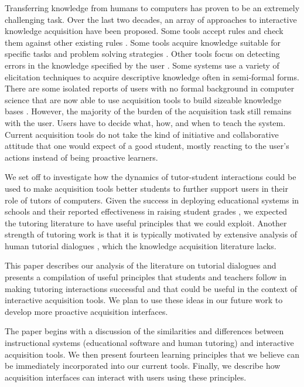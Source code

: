 \documentclass{llncs}
\begin{document}
Transferring knowledge from humans to computers has proven to be an extremely
challenging task.  Over the last two decades, an array of approaches to
interactive knowledge acquisition have been proposed.  Some tools accept rules
and check them against other existing rules \cite{Davis79,seek2}.  Some tools
acquire knowledge suitable for specific tasks and problem solving strategies
\cite{MarcusM89}.  Other tools focus on detecting errors in the knowledge
specified by the user \cite{GilM96,KimG99,chimaera00}.  Some systems use a
variety of elicitation techniques to acquire descriptive knowledge
\cite{GainesS93,cmaps1} often in semi-formal forms.  There are some isolated
reports of users with no formal background in computer science that are now
able to use acquisition tools to build sizeable knowledge bases
\cite{KimG00,EriksEA95,Clark01}.
However, the majority of the burden of the acquisition task still remains with
the user.  Users have to decide what, how, and when to teach the system.  
Current acquisition tools do not take the kind of
initiative and collaborative attitude that one would expect of a good student,
mostly reacting to the user's actions instead of being proactive learners.

We set off to investigate how the dynamics of tutor-student interactions could
be used to make acquisition tools better students to further support users in
their role of tutors of computers.    Given the success in deploying
educational systems in schools and their reported effectiveness in raising
student grades \cite{Koedinger97}, we expected the tutoring
literature to have useful principles that we could exploit.  Another
strength of tutoring work is that it is typically motivated by extensive
analysis of human tutorial dialogues \cite{Fox93}, which the knowledge
acquisition literature lacks.

This paper describes our analysis of the literature on tutorial dialogues and
presents a compilation of useful principles that students and teachers follow
in making tutoring interactions successful and that could be useful in the
context of interactive acquisition tools.  We plan to use these ideas in our
future work to develop more proactive acquisition interfaces.  

The paper begins with a discussion of the similarities and differences between
instructional systems (educational software and human tutoring) and
interactive acquisition tools.  We then present fourteen learning principles
that we believe can be immediately incorporated into our current tools.
Finally, we describe how acquisition interfaces can interact with users using
these principles.
\end{document}
